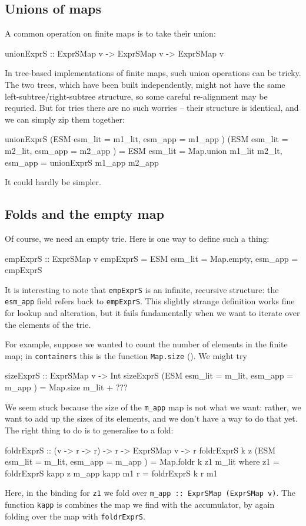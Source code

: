 \documentclass[acmsmall]{acmart}
\theoremstyle{theorem}
\theoremstyle{definition}
\theoremstyle{remark}
\begin{document}
\subsection{Unions of maps}

A common operation on finite maps is to take their union:
\begin{code}
unionExprS :: ExprSMap v -> ExprSMap v -> ExprSMap v
\end{code}
In tree-based implementations of finite maps, such union operations can be tricky.
The two trees, which have been built independently, might not have the same
left-subtree/right-subtree structure, so some careful re-alignment may be requried.
But for tries there are no such worries --
their structure is identical, and we can simply zip them together:
\begin{code}
unionExprS (ESM { esm_lit = m1_lit, esm_app = m1_app })
           (ESM { esm_lit = m2_lit, esm_app = m2_app })
   = ESM { esm_lit = Map.union m1_lit m2_lt, esm_app = unionExprS m1_app m2_app }
\end{code}
It could hardly be simpler.

\subsection{Folds and the empty map} \label{sec:fold}

Of course, we need an empty trie. Here is one way to define such a thing:
\begin{code}
empExprS :: ExprSMap v
empExprS = ESM { esm_lit = Map.empty, esm_app = empExprS }
\end{code}
It is interesting to note that \lstinline{empExprS} is an infinite, recursive structure:
the \lstinline{esm_app} field refers back to \lstinline{empExprS}.
This slightly strange definition works fine for lookup and alteration, but it fails
fundamentally when we want to iterate over the elements of the trie.

For example, suppose we wanted to count the number of elements in the finite map; in \lstinline{containers}
this is the function \lstinline{Map.size} ().  We might try
\begin{code}
  sizeExprS :: ExprSMap v -> Int
  sizeExprS (ESM { esm_lit = m_lit, esm_app = m_app })
    = Map.size m_lit + ???
\end{code}
We seem stuck because the size of the \lstinline{m_app} map is not what we want: rather,
we want to add up the sizes of its elements, and we don't have a way to do that yet.
The right thing to do is to generalise to a fold:
\begin{code}
  foldrExprS :: (v -> r -> r) -> r -> ExprSMap v -> r
  foldrExprS k z (ESM { esm_lit = m_lit, esm_app = m_app })
    = Map.foldr k z1 m_lit
    where
      z1 = foldrExprS kapp z m_app
      kapp m1 r = foldrExprS k r m1
\end{code}
Here, in the binding for \lstinline{z1} we fold over \lstinline{m_app :: ExprSMap (ExprSMap v)}.
The function \lstinline{kapp} is combines the map we find with the accumulator, by again
folding over the map with \lstinline{foldrExprS}.
\end{document}
